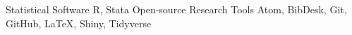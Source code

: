 

\begin{cvskills}

  \cvskill
    {Statistical Software} %
    {R, Stata} %
  \cvskill
    {Open-source Research Tools} %
    {Atom, BibDesk, Git, GitHub, LaTeX, Shiny, Tidyverse} %

\end{cvskills}
